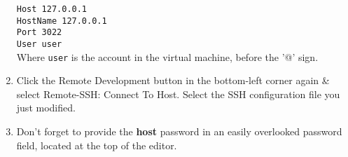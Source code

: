 \documentclass[10pt]{article}
\begin{document}
\begin{enumerate}
    \texttt{Host 127.0.0.1} \\
    \texttt{HostName 127.0.0.1} \\
    \texttt{Port 3022} \\
    \texttt{User user} \\
    Where \texttt{user} is the account in the virtual machine, before the '@' sign.
    \item Click the Remote Development button in the bottom-left corner again \& select Remote-SSH: Connect To Host. Select the SSH configuration file you just modified.
    \item Don't forget to provide the \textbf{host} password in an easily overlooked password field, located at the top of the editor.
\end{enumerate}
\end{document}
